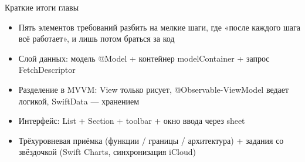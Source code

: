 \begin{tcbsummary}{Краткие итоги главы}
\begin{itemize}
  \item Пять элементов требований разбить на мелкие шаги, где «после каждого шага всё работает», и лишь потом браться за код
  \item Слой данных: модель @Model + контейнер modelContainer + запрос FetchDescriptor
  \item Разделение в MVVM: View только рисует, @Observable-ViewModel ведает логикой, SwiftData — хранением
  \item Интерфейс: List + Section + toolbar + окно ввода через sheet
  \item Трёхуровневая приёмка (функции / границы / архитектура) + задания со звёздочкой (Swift Charts, синхронизация iCloud)
\end{itemize}

\end{tcbsummary}

